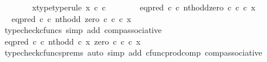 \begin{isabellebody}
\ \ \ \ \ \ \isamarkupfalse%
\ x{\isacharunderscore}{\kern0pt}type{\isacharbrackleft}{\kern0pt}type{\isacharunderscore}{\kern0pt}rule{\isacharbrackright}{\kern0pt}{\isacharcolon}{\kern0pt}\ {\isachardoublequoteopen}x\ {\isasymin}\isactrlsub c\ {\isasymnat}\isactrlsub c{\isachardoublequoteclose}\isanewline
\ \ \ \ \ \ \isamarkupfalse%
\ {\isachardoublequoteopen}{\isacharparenleft}{\kern0pt}eq{\isacharunderscore}{\kern0pt}pred\ {\isasymnat}\isactrlsub c\ {\isasymcirc}\isactrlsub c\ {\isasymlangle}nth{\isacharunderscore}{\kern0pt}odd{\isacharcomma}{\kern0pt}zero\ {\isasymcirc}\isactrlsub c\ {\isasymbeta}\isactrlbsub {\isasymnat}\isactrlsub c\isactrlesub {\isasymrangle}{\isacharparenright}{\kern0pt}\ {\isasymcirc}\isactrlsub c\ x\ {\isacharequal}{\kern0pt}\ {\isasymt}{\isachardoublequoteclose}\isanewline
\ \ \ \ \ \ \isamarkupfalse%
\ \isamarkupfalse%
\ {\isachardoublequoteopen}eq{\isacharunderscore}{\kern0pt}pred\ {\isasymnat}\isactrlsub c\ {\isasymcirc}\isactrlsub c\ {\isasymlangle}nth{\isacharunderscore}{\kern0pt}odd{\isacharcomma}{\kern0pt}\ zero\ {\isasymcirc}\isactrlsub c\ {\isasymbeta}\isactrlbsub {\isasymnat}\isactrlsub c\isactrlesub {\isasymrangle}\ {\isasymcirc}\isactrlsub c\ x\ {\isacharequal}{\kern0pt}\ {\isasymt}{\isachardoublequoteclose}\isanewline
\ \ \ \ \ \ \ \ \isamarkupfalse%
\ {\isacharparenleft}{\kern0pt}typecheck{\isacharunderscore}{\kern0pt}cfuncs{\isacharcomma}{\kern0pt}\ simp\ add{\isacharcolon}{\kern0pt}\ comp{\isacharunderscore}{\kern0pt}associative{}{\isacharparenright}{\kern0pt}\isanewline
\ \ \ \ \ \ \isamarkupfalse%
\ \isamarkupfalse%
\ {\isachardoublequoteopen}eq{\isacharunderscore}{\kern0pt}pred\ {\isasymnat}\isactrlsub c\ {\isasymcirc}\isactrlsub c\ {\isasymlangle}nth{\isacharunderscore}{\kern0pt}odd\ {\isasymcirc}\isactrlsub c\ x{\isacharcomma}{\kern0pt}\ zero\ {\isasymcirc}\isactrlsub c\ {\isasymbeta}\isactrlbsub {\isasymnat}\isactrlsub c\isactrlesub \ {\isasymcirc}\isactrlsub c\ x{\isasymrangle}\ {\isacharequal}{\kern0pt}\ {\isasymt}{\isachardoublequoteclose}\isanewline
\ \ \ \ \ \ \ \ \isamarkupfalse%
\ {\isacharparenleft}{\kern0pt}typecheck{\isacharunderscore}{\kern0pt}cfuncs{\isacharunderscore}{\kern0pt}prems{\isacharcomma}{\kern0pt}\ auto\ simp\ add{\isacharcolon}{\kern0pt}\ cfunc{\isacharunderscore}{\kern0pt}prod{\isacharunderscore}{\kern0pt}comp\ comp{\isacharunderscore}{\kern0pt}associative{}{\isacharparenright}{\kern0pt}\isanewline
\ \ \ \ \ \ \isamarkupfalse%

\end{isabellebody}
